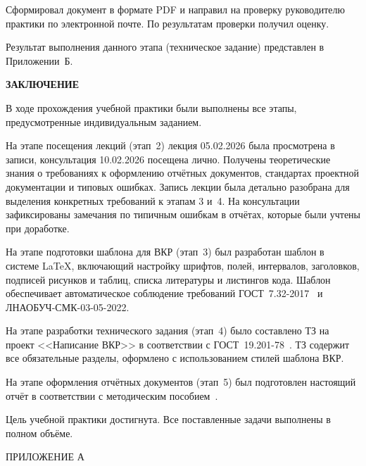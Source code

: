 \documentclass[a4paper,14pt]{extarticle}
\begin{document}
Сформировал документ в формате PDF и направил на проверку руководителю практики по электронной почте. По результатам проверки получил оценку.

Результат выполнения данного этапа (техническое задание) представлен в Приложении~Б.

\newpage

\begin{center}
\textbf{ЗАКЛЮЧЕНИЕ}
\end{center}

В ходе прохождения учебной практики были выполнены все этапы, предусмотренные индивидуальным заданием.

На этапе посещения лекций (этап~2) лекция 05.02.2026 была просмотрена в записи, консультация 10.02.2026 посещена лично. Получены теоретические знания о требованиях к оформлению отчётных документов, стандартах проектной документации и типовых ошибках. Запись лекции была детально разобрана для выделения конкретных требований к этапам 3 и~4. На консультации зафиксированы замечания по типичным ошибкам в отчётах, которые были учтены при доработке.

На этапе подготовки шаблона для ВКР (этап~3) был разработан шаблон в системе \LaTeX{}, включающий настройку шрифтов, полей, интервалов, заголовков, подписей рисунков и таблиц, списка литературы и листингов кода. Шаблон обеспечивает автоматическое соблюдение требований ГОСТ~7.32-2017~\cite{gost732} и ЛНАОБУЧ-СМК-03-05-2022.

На этапе разработки технического задания (этап~4) было составлено ТЗ на проект <<Написание ВКР>> в соответствии с ГОСТ~19.201-78~\cite{gost19201}. ТЗ содержит все обязательные разделы, оформлено с использованием стилей шаблона ВКР.

На этапе оформления отчётных документов (этап~5) был подготовлен настоящий отчёт в соответствии с методическим пособием~\cite{markina2020}.

Цель учебной практики достигнута. Все поставленные задачи выполнены в полном объёме.

\newpage

{}



\newpage

\begin{flushright}
ПРИЛОЖЕНИЕ А
\end{flushright}
\end{document}
